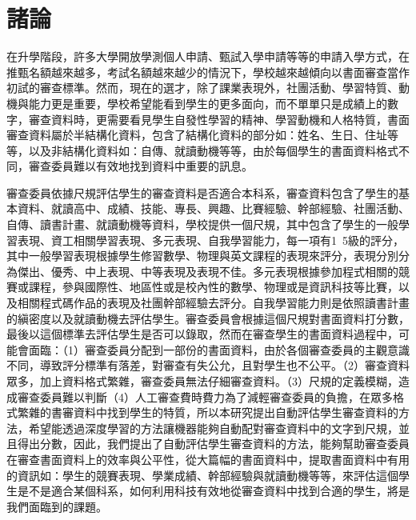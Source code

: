 
\chapter{諸論}

在升學階段，許多大學開放學測個人申請、甄試入學申請等等的申請入學方式，在推甄名額越來越多，考試名額越來越少的情況下，學校越來越傾向以書面審查當作初試的審查標準。然而，現在的選才，除了課業表現外，社團活動、學習特質、動機與能力更是重要，學校希望能看到學生的更多面向，而不單單只是成績上的數字，審查資料時，更需要看見學生自發性學習的精神、學習動機和人格特質，書面審查資料屬於半結構化資料，包含了結構化資料的部分如：姓名、生日、住址等等，以及非結構化資料如：自傳、就讀動機等等，由於每個學生的書面資料格式不同，審查委員難以有效地找到資料中重要的訊息。

審查委員依據尺規評估學生的審查資料是否適合本科系，審查資料包含了學生的基本資料、就讀高中、成績、技能、專長、興趣、比賽經驗、幹部經驗、社團活動、自傳、讀書計畫、就讀動機等資料，學校提供一個尺規，其中包含了學生的一般學習表現、資工相關學習表現、多元表現、自我學習能力，每一項有1~5級的評分，其中一般學習表現根據學生修習數學、物理與英文課程的表現來評分，表現分別分為傑出、優秀、中上表現、中等表現及表現不佳。多元表現根據參加程式相關的競賽或課程，參與國際性、地區性或是校內性的數學、物理或是資訊科技等比賽，以及相關程式碼作品的表現及社團幹部經驗去評分。自我學習能力則是依照讀書計畫的縝密度以及就讀動機去評估學生。審查委員會根據這個尺規對書面資料打分數，最後以這個標準去評估學生是否可以錄取，然而在審查學生的書面資料過程中，可能會面臨：（1）審查委員分配到一部份的書面資料，由於各個審查委員的主觀意識不同，導致評分標準有落差，對審查有失公允，且對學生也不公平。（2）審查資料眾多，加上資料格式繁雜，審查委員無法仔細審查資料。（3）尺規的定義模糊，造成審查委員難以判斷（4）人工審查費時費力為了減輕審查委員的負擔，在眾多格式繁雜的書審資料中找到學生的特質，所以本研究提出自動評估學生審查資料的方法，希望能透過深度學習的方法讓機器能夠自動配對審查資料中的文字到尺規，並且得出分數，因此，我們提出了自動評估學生審查資料的方法，能夠幫助審查委員在審查書面資料上的效率與公平性，從大篇幅的書面資料中，提取書面資料中有用的資訊如：學生的競賽表現、學業成績、幹部經驗與就讀動機等等，來評估這個學生是不是適合某個科系，如何利用科技有效地從審查資料中找到合適的學生，將是我們面臨到的課題。